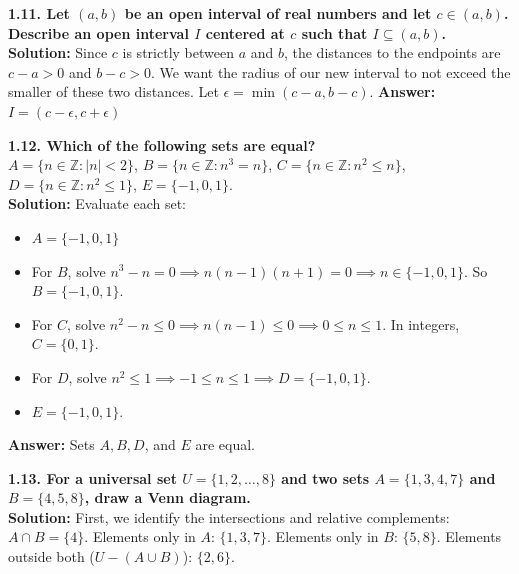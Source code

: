 \documentclass[12pt]{article}
\begin{document}
\vspace{0.5cm}
\textbf{1.11. Let $(a,b)$ be an open interval of real numbers and let $c \in (a,b)$. Describe an open interval $I$ centered at $c$ such that $I \subseteq (a,b)$.} \\
\textbf{Solution:}
Since $c$ is strictly between $a$ and $b$, the distances to the endpoints are $c-a > 0$ and $b-c > 0$. We want the radius of our new interval to not exceed the smaller of these two distances.
Let $\epsilon = \min(c-a, b-c)$.
\textbf{Answer:} $I = (c - \epsilon, c + \epsilon)$

\vspace{0.5cm}
\textbf{1.12. Which of the following sets are equal?} \\
$A = \{n \in \mathbb{Z} : |n| < 2\}$, $B = \{n \in \mathbb{Z} : n^3 = n\}$, $C = \{n \in \mathbb{Z} : n^2 \le n\}$, $D = \{n \in \mathbb{Z} : n^2 \le 1\}$, $E = \{-1, 0, 1\}$. \\
\textbf{Solution:}
Evaluate each set:
\begin{itemize}
    \item $A = \{-1, 0, 1\}$
    \item For $B$, solve $n^3 - n = 0 \implies n(n-1)(n+1) = 0 \implies n \in \{-1, 0, 1\}$. So $B = \{-1, 0, 1\}$.
    \item For $C$, solve $n^2 - n \le 0 \implies n(n-1) \le 0 \implies 0 \le n \le 1$. In integers, $C = \{0, 1\}$.
    \item For $D$, solve $n^2 \le 1 \implies -1 \le n \le 1 \implies D = \{-1, 0, 1\}$.
    \item $E = \{-1, 0, 1\}$.
\end{itemize}
\textbf{Answer:} Sets $A, B, D$, and $E$ are equal.

\vspace{0.5cm}
\textbf{1.13. For a universal set $U = \{1, 2, \dots, 8\}$ and two sets $A = \{1, 3, 4, 7\}$ and $B = \{4, 5, 8\}$, draw a Venn diagram.} \\
\textbf{Solution:}
First, we identify the intersections and relative complements:
$A \cap B = \{4\}$.
Elements only in $A$: $\{1, 3, 7\}$.
Elements only in $B$: $\{5, 8\}$.
Elements outside both ($U - (A \cup B)$): $\{2, 6\}$.
\begin{center}
\end{center}
\end{document}
